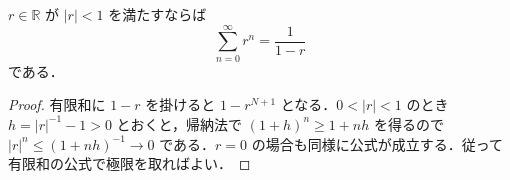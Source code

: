 \begin{prop}[等比級数]
$r\in\mathbb R$ が $|r|<1$ を満たすならば
\[
 \sum_{n=0}^\infty r^n=\frac1{1-r}
\]
である．
\end{prop}
\begin{proof}
有限和に $1-r$ を掛けると $1-r^{N+1}$ となる．$0<|r|<1$ のとき $h=|r|^{-1}-1>0$ とおくと，帰納法で $(1+h)^n\geq1+nh$ を得るので $|r|^n\leq(1+nh)^{-1}\to0$ である．$r=0$ の場合も同様に公式が成立する．従って有限和の公式で極限を取ればよい．
\end{proof}
